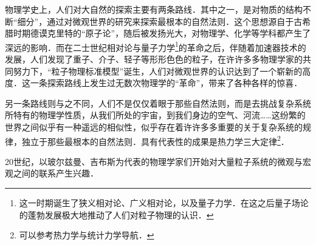 
物理学史上，人们对大自然的探索主要有两条路线．其中之一，是对物质的结构不断“细分”，通过对微观世界的研究来探索最根本的自然法则．这个思想源自于古希腊时期德谟克里特的“原子论”，随后被发扬光大，对物理学、化学等学科都产生了深远的影响．而在二士世纪相对论与量子力学\footnote{这一时期诞生了狭义相对论、广义相对论，以及量子力学．在这之后量子场论的蓬勃发展极大地推动了人们对粒子物理的认识．}的革命之后，伴随着加速器技术的发展，人们发现了重子、介子、轻子等形形色色的粒子，在许许多多物理学家的共同努力下，“粒子物理标准模型”诞生，人们对微观世界的认识达到了一个崭新的高度．这一条探索路线上发生过无数次物理学的“革命”，带来了各种各样的惊喜．

另一条路线则与之不同，人们不是仅仅着眼于那些自然法则，而是去挑战复杂系统所特有的物理学性质，从我们所处的宇宙，到我们身边的空气、河流……这纷繁的世界之间似乎有一种遥远的相似性，似乎存在着许许多多重要的关于复杂系统的规律，独立于那些最根本的自然法则．具有代表性的成果是热力学三大定律\footnote{可以参考热力学与统计力学导航．}．

20世纪，以玻尔兹曼、吉布斯为代表的物理学家们开始对大量粒子系统的微观与宏观之间的联系产生兴趣．